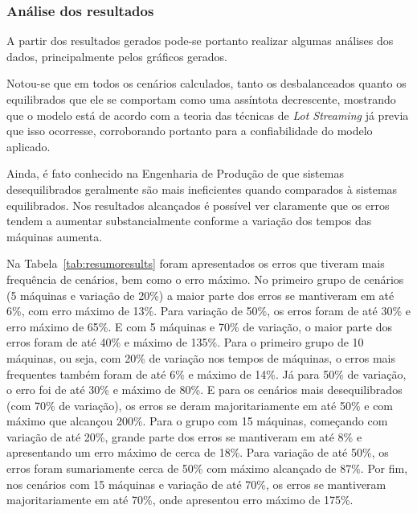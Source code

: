     
    
    \subsubsection{Análise dos resultados}
    
    A partir dos resultados gerados pode-se portanto realizar algumas análises dos dados, principalmente pelos gráficos gerados. 
    
    Notou-se que em todos os cenários calculados, tanto os desbalanceados quanto os equilibrados que ele se comportam como uma assíntota decrescente, mostrando que o modelo está de acordo com a teoria das técnicas de \textit{Lot Streaming} já previa que isso ocorresse, corroborando portanto para a confiabilidade do modelo aplicado. 
    
    Ainda, é fato conhecido na Engenharia de Produção de que sistemas desequilibrados geralmente são mais ineficientes quando comparados à sistemas equilibrados. Nos resultados alcançados é possível ver claramente que os erros tendem a aumentar substancialmente conforme a variação dos tempos das máquinas aumenta. 
    
    Na Tabela~\ref{tab:resumoresults} foram apresentados os erros que tiveram mais frequência de cenários, bem como o erro máximo. No primeiro grupo de cenários (5 máquinas e variação de 20\%) a maior parte dos erros se mantiveram em até 6\%, com erro máximo de 13\%. Para variação de 50\%, os erros foram de até 30\% e erro máximo de 65\%. E com 5 máquinas e 70\% de variação, o maior parte dos erros foram de até 40\% e máximo de 135\%. Para o primeiro grupo de 10 máquinas, ou seja, com 20\% de variação nos tempos de máquinas, o erros mais frequentes também foram de até 6\% e máximo de 14\%. Já para 50\% de variação, o erro foi de até 30\% e máximo de 80\%. E para os cenários mais desequilibrados (com 70\% de variação), os erros se deram majoritariamente em até 50\% e com máximo que alcançou 200\%. Para o grupo com 15 máquinas, começando com variação de até 20\%, grande parte dos erros se mantiveram em até 8\% e apresentando um erro máximo de cerca de 18\%. Para variação de até 50\%, os erros foram sumariamente cerca de 50\% com máximo alcançado de 87\%. Por fim, nos cenários com 15 máquinas e variação de até 70\%, os erros se mantiveram majoritariamente em até 70\%, onde apresentou erro máximo de 175\%.
    
    
    
